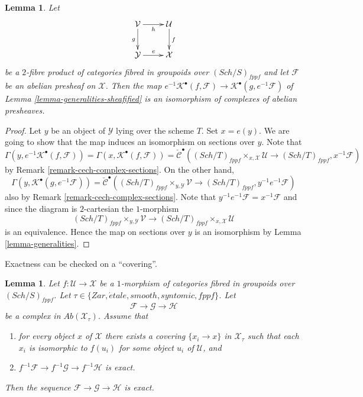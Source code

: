 \documentclass{stacks-project}
\theoremstyle{plain}
\newtheorem{lemma}[subsection]{Lemma}
\theoremstyle{definition}
\theoremstyle{remark}
\numberwithin{equation}{subsection}
\def\Sch{\mathit{Sch}}
\def\etale{{\acute{e}tale}}
\begin{document}
\begin{lemma}
\label{lemma-base-change-cech-complex}
Let
$$
\xymatrix{
\mathcal{V} \ar[d]_g \ar[r]_h & \mathcal{U} \ar[d]^f \\
\mathcal{Y} \ar[r]^e & \mathcal{X}
}
$$
be a $2$-fibre product of categories fibred in groupoids over
$(\Sch/S)_{fppf}$ and let $\mathcal{F}$ be an abelian presheaf
on $\mathcal{X}$. Then the map
$e^{-1}\mathcal{K}^\bullet(f, \mathcal{F}) \to
\mathcal{K}^\bullet(g, e^{-1}\mathcal{F})$
of
Lemma \ref{lemma-generalities-sheafified}
is an isomorphism of complexes of abelian presheaves.
\end{lemma}

\begin{proof}
Let $y$ be an object of $\mathcal{Y}$ lying over the scheme $T$.
Set $x = e(y)$. We are going to show that the map induces an isomorphism
on sections over $y$. Note that
$$
\Gamma(y, e^{-1}\mathcal{K}^\bullet(f, \mathcal{F})) =
\Gamma(x, \mathcal{K}^\bullet(f, \mathcal{F})) =
\check{\mathcal{C}}^\bullet(
(\Sch/T)_{fppf} \times_{x, \mathcal{X}} \mathcal{U} \to
(\Sch/T)_{fppf}, x^{-1}\mathcal{F})
$$
by
Remark \ref{remark-cech-complex-sections}. On the other hand,
$$
\Gamma(y, \mathcal{K}^\bullet(g, e^{-1}\mathcal{F})) =
\check{\mathcal{C}}^\bullet(
(\Sch/T)_{fppf} \times_{y, \mathcal{Y}} \mathcal{V} \to
(\Sch/T)_{fppf}, y^{-1}e^{-1}\mathcal{F})
$$
also by
Remark \ref{remark-cech-complex-sections}.
Note that $y^{-1}e^{-1}\mathcal{F} = x^{-1}\mathcal{F}$
and since the diagram is $2$-cartesian the $1$-morphism
$$
(\Sch/T)_{fppf} \times_{y, \mathcal{Y}} \mathcal{V} \to
(\Sch/T)_{fppf} \times_{x, \mathcal{X}} \mathcal{U}
$$
is an equivalence. Hence the map on sections over $y$ is an
isomorphism by
Lemma \ref{lemma-generalities}.
\end{proof}

\noindent
Exactness can be checked on a ``covering''.

\begin{lemma}
\label{lemma-check-exactness-covering}
Let $f : \mathcal{U} \to \mathcal{X}$ be a $1$-morphism of categories fibred
in groupoids over $(\Sch/S)_{fppf}$. Let
$\tau \in \{Zar, \etale, smooth, syntomic, fppf\}$.
Let
$$
\mathcal{F} \to \mathcal{G} \to \mathcal{H}
$$
be a complex in $\textit{Ab}(\mathcal{X}_\tau)$. Assume that
\begin{enumerate}
\item for every object $x$ of $\mathcal{X}$ there exists a covering
$\{x_i \to x\}$ in $\mathcal{X}_\tau$ such that each $x_i$ is isomorphic
to $f(u_i)$ for some object $u_i$ of $\mathcal{U}$, and
\item $f^{-1}\mathcal{F} \to f^{-1}\mathcal{G} \to f^{-1}\mathcal{H}$ is exact.
\end{enumerate}
Then the sequence $\mathcal{F} \to \mathcal{G} \to \mathcal{H}$
is exact.
\end{lemma}
\end{document}
